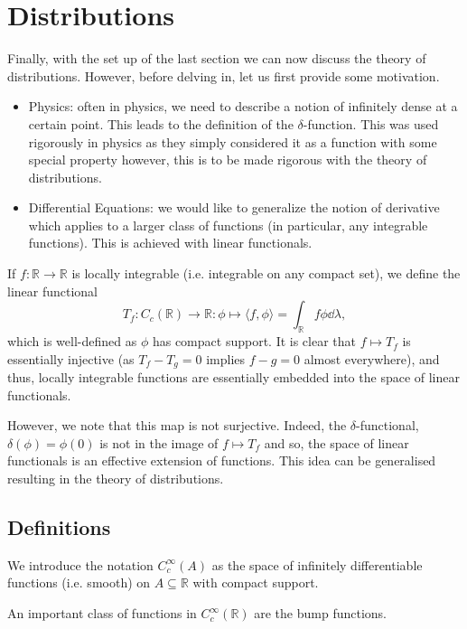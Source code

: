 \documentclass[]{article}
\theoremstyle{definition}
\theoremstyle{definition}
\begin{document}
\newpage
\section{Distributions}

Finally, with the set up of the last section we can now discuss the theory of 
distributions. However, before delving in, let us first provide some motivation.
\begin{itemize}
  \item Physics: often in physics, we need to describe a notion of infinitely 
    dense at a certain point. This leads to the definition of the \(\delta\)-function.
    This was used rigorously in physics as they simply considered it as a 
    function with some special property however, this is to be made rigorous 
    with the theory of distributions. 
  \item Differential Equations: we would like to generalize the notion of derivative 
    which applies to a larger class of functions (in particular, any integrable functions).
    This is achieved with linear functionals. 
\end{itemize}
If \(f : \mathbb{R} \to \mathbb{R}\) is locally integrable (i.e. integrable 
on any compact set), we define the linear functional
\[T_f : C_c(\mathbb{R}) \to \mathbb{R} : \phi \mapsto 
  \langle f, \phi\rangle = \int_{\mathbb{R}} f\phi \dd \lambda,\]
which is well-defined as \(\phi\) has compact support. It is clear that 
\(f \mapsto T_f\) is essentially injective 
(as \(T_f - T_g = 0\) implies \(f - g = 0\) almost everywhere), and thus, 
locally integrable functions are essentially embedded into the space of 
linear functionals. 

However, we note that this map is not surjective. 
Indeed, the \(\delta\)-functional, \(\delta(\phi) = \phi(0)\) is not
in the image of \(f \mapsto T_f\) and so, the space of linear functionals 
is an effective extension of functions. This idea can be generalised resulting 
in the theory of distributions.

\subsection{Definitions}

We introduce the notation \(C_c^\infty(A)\) as the space of infinitely 
differentiable functions (i.e. smooth) on \(A \subseteq \mathbb{R}\) with 
compact support.

An important class of functions in \(C_c^\infty(\mathbb{R})\) are the bump 
functions. 
\end{document}
